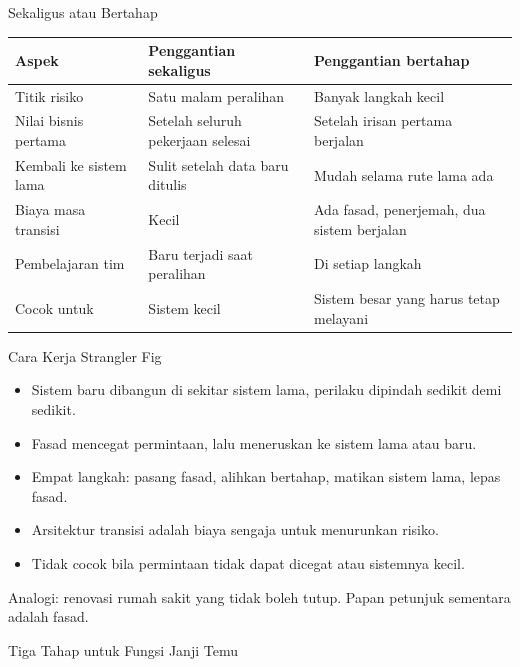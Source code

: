 \documentclass[aspectratio=169, table, 12pt]{beamer}
\begin{document}
\begin{frame}{{\Large Sekaligus atau Bertahap}}
  \footnotesize
  \begin{tabularx}{\textwidth}{>{\raggedright\arraybackslash}p{2.8cm}
      >{\raggedright\arraybackslash}X >{\raggedright\arraybackslash}X}
    \hline
    \textbf{Aspek} & \textbf{Penggantian sekaligus} & \textbf{Penggantian bertahap} \\ \hline
    Titik risiko & Satu malam peralihan & Banyak langkah kecil \\ \hline
    Nilai bisnis pertama & Setelah seluruh pekerjaan selesai & Setelah irisan pertama berjalan \\
      \hline
    Kembali ke sistem lama & Sulit setelah data baru ditulis & Mudah selama rute lama ada \\ \hline
    Biaya masa transisi & Kecil & Ada fasad, penerjemah, dua sistem berjalan \\ \hline
    Pembelajaran tim & Baru terjadi saat peralihan & Di setiap langkah \\ \hline
    Cocok untuk & Sistem kecil & Sistem besar yang harus tetap melayani \\ \hline
  \end{tabularx}
\end{frame}

\begin{frame}{{\Large Cara Kerja Strangler Fig}}
  \vspace{10pt}
  \begin{itemize}
    \item Sistem baru dibangun di sekitar sistem lama, perilaku dipindah sedikit demi sedikit.
    \item Fasad mencegat permintaan, lalu meneruskan ke sistem lama atau baru.
    \item Empat langkah: pasang fasad, alihkan bertahap, matikan sistem lama, lepas fasad.
    \item Arsitektur transisi adalah biaya sengaja untuk menurunkan risiko.
    \item Tidak cocok bila permintaan tidak dapat dicegat atau sistemnya kecil.
  \end{itemize}
  \vspace{6pt}
  {\small Analogi: renovasi rumah sakit yang tidak boleh tutup. Papan petunjuk sementara adalah
  fasad.}
\end{frame}

\begin{frame}{{\Large Tiga Tahap untuk Fungsi Janji Temu}}
  \centering
\end{frame}
\end{document}
